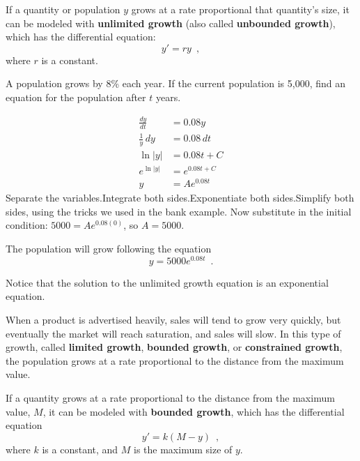 \begin{definition}
If a quantity or population $y$ grows at a rate proportional that quantity's size, it can be modeled with {\bf unlimited growth} (also called {\bf unbounded growth}), which has the differential equation:
$$y'=ry \enspace ,$$
where $r$ is a constant.
\end{definition}

\begin{example}
A population grows by 8\% each year. If the current population is 5,000, find an equation for the population after $t$ years.

\begin{solution}
\begin{align*}
  \frac{dy}{dt} &= 0.08y  \\
  \frac{1}{y}\,dy &= 0.08\,dt \\
  \ln|y| &= 0.08t+C \\
  e^{\ln|y|} &= e^{0.08t+C}\\
  y &= Ae^{0.08t}
\end{align*}
  Separate the variables.Integrate both sides.Exponentiate both sides.Simplify both sides, using the tricks we used in the bank example.
Now substitute in the initial condition: $5000=Ae^{0.08(0)}$, so $A=5000$.

The population will grow following the equation
$$y=5000e^{0.08t} \enspace .$$
\end{solution}\end{example}

Notice that the solution to the unlimited growth equation is an exponential equation.

When a product is advertised heavily, sales will tend to grow very quickly, but eventually the market will reach saturation, and sales will slow. In this type of growth, called {\bf limited growth}, {\bf bounded growth}, or {\bf constrained growth}, the population grows at a rate proportional to the distance from the maximum value.

\begin{definition}
If a quantity grows at a rate proportional to the distance from the maximum value, $M$, it can be modeled with {\bf bounded growth}, which has the differential equation
$$y'=k(M-y) \enspace ,$$
where $k$ is a constant, and $M$ is the maximum size of $y$.
\end{definition}

